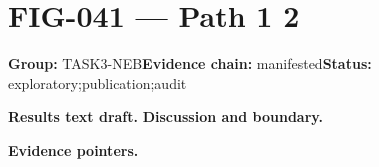 \clearpage
\section{FIG-041 --- Path 1 2}
\label{figpage:fig-041}
\textbf{Group:} TASK3-NEB\quad \textbf{Evidence chain:} manifested\quad \textbf{Status:} exploratory;publication;audit

\textbf{Results text draft.} 
\textbf{Discussion and boundary.} 


\textbf{Evidence pointers.}



\vfill

